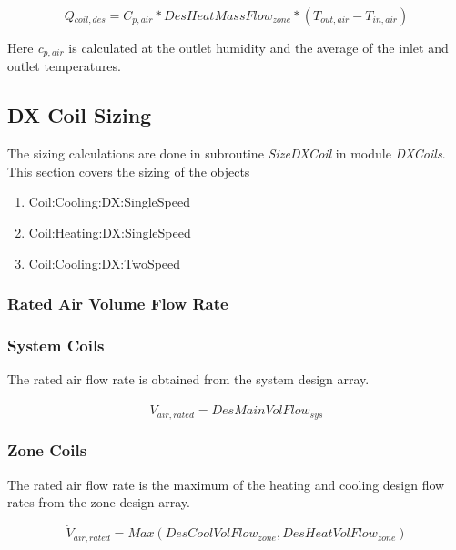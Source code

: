 \begin{equation}
\textit{Q\(_{coil,des}\)} = \textit{C\(_{p,air}\)} * \textit{DesHeatMassFlow\(_{zone}\)} *(\textit{T\(_{out,air}\)}-\textit{T\(_{in,air}\)})
\end{equation}

Here \emph{c\(_{p,air}\)} is calculated at the outlet humidity and the average of the inlet and outlet temperatures.

\subsection{DX Coil Sizing}\label{dx-coil-sizing}

The sizing calculations are done in subroutine \emph{SizeDXCoil} in module \emph{DXCoils}. This section covers the sizing of the objects

\begin{enumerate}
\def\labelenumi{\arabic{enumi}.}
\item
  Coil:Cooling:DX:SingleSpeed
\item
  Coil:Heating:DX:SingleSpeed
\item
  Coil:Cooling:DX:TwoSpeed
\end{enumerate}

\subsubsection{Rated Air Volume Flow Rate}\label{rated-air-volume-flow-rate}

\subsubsection{System Coils}\label{system-coils-4}

The rated air flow rate is obtained from the system design array.

\begin{equation}
\dot V_{air,rated} = DesMainVolFlow_{sys}
\end{equation}

\subsubsection{Zone Coils}\label{zone-coils-4}

The rated air flow rate is the maximum of the heating and cooling design flow rates from the zone design array.

\begin{equation}
\dot V_{air,rated} = Max(DesCoolVolFlow_{zone},DesHeatVolFlow_{zone})
\end{equation}


